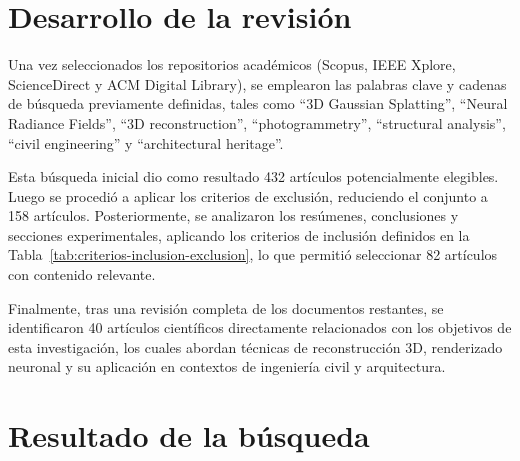 \documentclass[12pt,oneside]{report}
\begin{document}
\section{Desarrollo de la revisión}
Una vez seleccionados los repositorios académicos (Scopus, IEEE Xplore, ScienceDirect y ACM Digital Library), se emplearon las palabras clave y cadenas de búsqueda previamente definidas, tales como \enquote{3D Gaussian Splatting}, \enquote{Neural Radiance Fields}, \enquote{3D reconstruction}, \enquote{photogrammetry}, \enquote{structural analysis}, \enquote{civil engineering} y \enquote{architectural heritage}.\par

Esta búsqueda inicial dio como resultado 432 artículos potencialmente elegibles. Luego se procedió a aplicar los criterios de exclusión, reduciendo el conjunto a 158 artículos. Posteriormente, se analizaron los resúmenes, conclusiones y secciones experimentales, aplicando los criterios de inclusión definidos en la Tabla~\ref{tab:criterios-inclusion-exclusion}, lo que permitió seleccionar 82 artículos con contenido relevante.\par

Finalmente, tras una revisión completa de los documentos restantes, se identificaron 40 artículos científicos directamente relacionados con los objetivos de esta investigación, los cuales abordan técnicas de reconstrucción 3D, renderizado neuronal y su aplicación en contextos de ingeniería civil y arquitectura.\par

\section{Resultado de la búsqueda}
\end{document}
